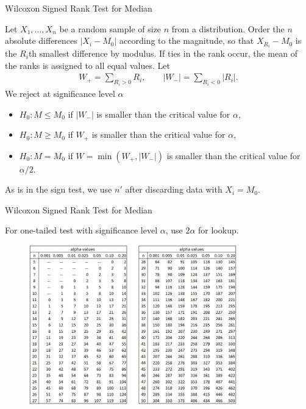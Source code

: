\begin{frame}{Wilcoxon Signed Rank Test for Median}

\justifying
{} Let $X_1, \ldots, X_n$ be a random sample of size $n$ from a  distribution. Order the $n$ absolute differences $|X_i - M_0|$ according to the magnitude, so that $X_{R_i} - M_0$ is the $R_i$th smallest difference by modulus. If ties in the rank occur, the mean of the ranks is assigned to all equal values. Let
\begin{align*}
W_+ = \sum_{R_i > 0} R_i, \qquad |W_-| = \sum_{R_i < 0} |R_i|.
\end{align*}
We reject at significance level $\alpha$
\begin{itemize}
	\justifying
	\item $H_0: M\leq M_0$ if $|W_-|$ is smaller than the critical value for $\alpha$,
	\item $H_0: M\geq M_0$ if $W_+$ is smaller than the critical value for $\alpha$,
	\item $H_0: M = M_0$ if $W = \min(W_+, |W_-|)$ is smaller than the critical value for $\alpha/2$.
\end{itemize}
As is in the sign test, we use $n'$ after discarding data with $X_i = M_0$.

\end{frame}


\begin{frame}{Wilcoxon Signed Rank Test for Median}

\justifying
{} For one-tailed test with significance level $\alpha$, use $2\alpha$ for lookup.
\begin{figure}[htbp]
	\centering
	\includegraphics[width=9cm]{./images/signed-rank-test.png}
\end{figure}

\end{frame}


